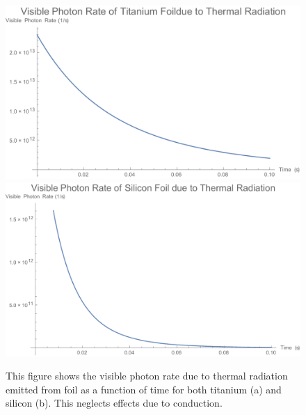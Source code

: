 \documentclass[12pt]{article}
\begin{document}
\begin{figure}
\begin{center}
\includegraphics[scale=0.5]{figures/PhotonRateTi.PDF}
\includegraphics[scale=0.5]{figures/PhotonRateSi.PDF}
\caption{This figure shows the visible photon rate due to thermal radiation emitted from foil as a function of time for both titanium (a) and silicon (b). This neglects effects due to conduction.}
\end{center}
\end{figure}
\end{document}
